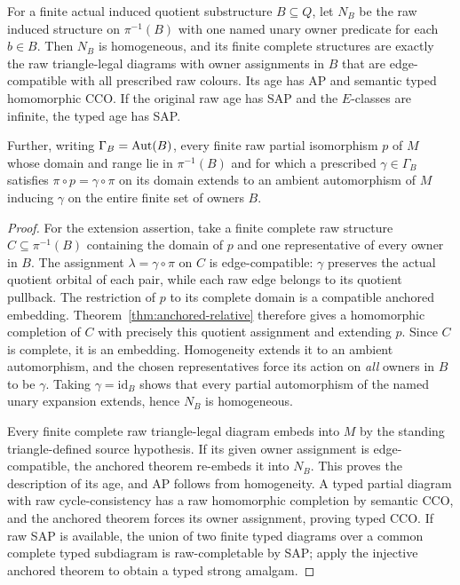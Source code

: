 \begin{proposition}
\label{prop:anchored-typed-source}
For a finite actual induced quotient substructure $B\subseteq Q$,
let $N_B$ be the raw induced structure on $\pi^{-1}(B)$ with one
named unary owner predicate for each $b\in B$.  Then $N_B$ is
homogeneous, and its finite complete structures are exactly the
raw triangle-legal diagrams with owner assignments in $B$ that
are edge-compatible with all prescribed raw colours.  Its age has
AP and semantic typed homomorphic CCO.  If the original raw age
has SAP and the $E$-classes are infinite, the typed age has SAP.

Further, writing $\Gamma_B=\operatorname{Aut}(B)$, every finite raw partial
isomorphism $p$ of $M$ whose domain and range lie in
$\pi^{-1}(B)$ and for which a prescribed $\gamma\in\Gamma_B$
satisfies $\pi\circ p=\gamma\circ\pi$ on its domain extends
to an ambient automorphism of $M$ inducing $\gamma$ on the
entire finite set of owners $B$.
\end{proposition}
\begin{proof}
For the extension assertion, take a finite complete raw structure
$C\subseteq\pi^{-1}(B)$ containing the domain of $p$ and one
representative of every owner in $B$.  The assignment $\lambda=\gamma\circ\pi$
on $C$ is edge-compatible: $\gamma$ preserves the actual quotient
orbital of each pair, while each raw edge belongs to its quotient
pullback.  The restriction of $p$ to its complete domain is a
compatible anchored embedding.  Theorem~\ref{thm:anchored-relative}
therefore gives a homomorphic completion of $C$ with precisely this
quotient assignment and extending $p$.  Since $C$ is complete, it is
an embedding.  Homogeneity extends it to an ambient automorphism,
and the chosen representatives force its action on \emph{all} owners
in $B$ to be $\gamma$.  Taking $\gamma=\mathrm{id}_B$ shows that
every partial automorphism of the named unary expansion extends,
hence $N_B$ is homogeneous.

Every finite complete raw triangle-legal diagram embeds into $M$
by the standing triangle-defined source hypothesis.  If its given
owner assignment is edge-compatible, the anchored theorem re-embeds
it into $N_B$.  This proves the description of its age, and AP
follows from homogeneity.  A typed partial diagram with raw
cycle-consistency has a raw homomorphic completion by semantic CCO,
and the anchored theorem forces its owner assignment, proving typed
CCO.  If raw SAP is available, the union of two finite typed
diagrams over a common complete typed subdiagram is raw-completable
by SAP; apply the injective anchored theorem to obtain a typed
strong amalgam.
\end{proof}

